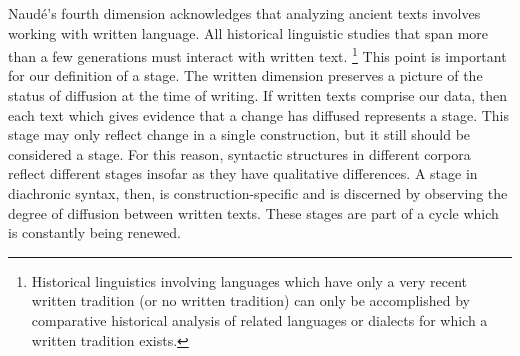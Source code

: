 \documentclass[output=paper,colorlinks,citecolor=brown,draft,draftmode]{langscibook}
\begin{document}
Naudé's fourth dimension acknowledges that analyzing ancient texts involves
working with written language. All historical linguistic studies that span
more than a few generations must interact with written text.%
%
\footnote{Historical linguistics involving languages which have only a very
recent written tradition (or no written tradition) can only be accomplished
by comparative historical analysis of related languages or dialects for
which a written tradition exists.} 
%
This point is
important for our definition of a stage. The written dimension preserves a
picture of the status of diffusion at the time of writing. If written texts
comprise our data, then each text which gives evidence that a change has
diffused represents a stage. This stage may only reflect change in a single
construction, but it still should be considered a stage. For this reason,
syntactic structures in different corpora reflect different stages insofar
as they have qualitative differences. A stage in diachronic syntax, then,
is construction-specific and is discerned by observing the degree of
diffusion between written texts. These stages are part of a cycle which is
constantly being renewed. 
\end{document}
